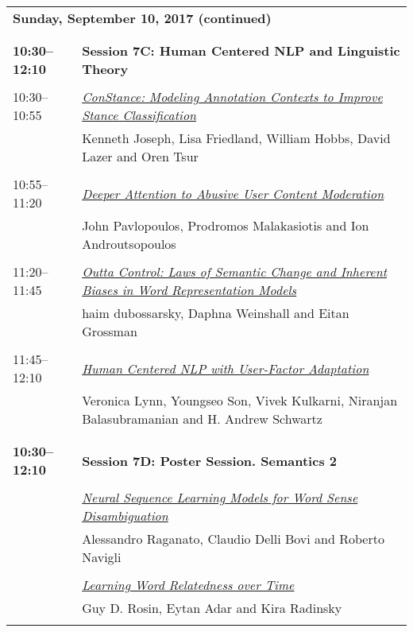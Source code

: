 \begin{tabular}{p{20mm}p{128mm}}
\\
\multicolumn{2}{l}{\bf Sunday, September 10, 2017 (continued)} \\\\
\\{\bf 10:30--12:10} & {\bf Session 7C: Human Centered NLP and Linguistic Theory } \\
\\
10:30--10:55 & \hyperlink{page.1124}{\em ConStance: Modeling Annotation Contexts to Improve Stance Classification}\\
         & Kenneth Joseph, Lisa Friedland, William Hobbs, David Lazer and Oren Tsur \\
\\

10:55--11:20 & \hyperlink{page.1134}{\em Deeper Attention to Abusive User Content Moderation}\\
         & John Pavlopoulos, Prodromos Malakasiotis and Ion Androutsopoulos \\
\\

11:20--11:45 & \hyperlink{page.1145}{\em Outta Control: Laws of Semantic Change and Inherent Biases in Word Representation Models}\\
         & haim dubossarsky, Daphna Weinshall and Eitan Grossman \\
\\

11:45--12:10 & \hyperlink{page.1155}{\em Human Centered NLP with User-Factor Adaptation}\\
         & Veronica Lynn, Youngseo Son, Vivek Kulkarni, Niranjan Balasubramanian and H. Andrew Schwartz \\
\\

\\{\bf 10:30--12:10} & {\bf Session 7D: Poster Session. Semantics 2 } \\
\\
 & \hyperlink{page.1165}{\em Neural Sequence Learning Models for Word Sense Disambiguation}\\
         & Alessandro Raganato, Claudio Delli Bovi and Roberto Navigli \\
\\

 & \hyperlink{page.1177}{\em Learning Word Relatedness over Time}\\
         & Guy D. Rosin, Eytan Adar and Kira Radinsky \\
\\


\end{tabular}
